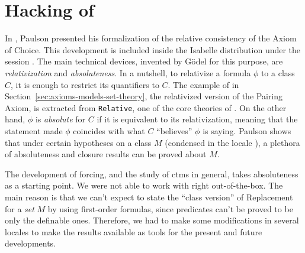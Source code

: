 \section{Hacking of }
\label{sec:hack-constructible}
In \cite{paulson_2003}, Paulson presented his formalization of the
relative consistency of the Axiom of Choice. This development is
included inside the Isabelle distribution under the session 
. The main technical devices, invented by
G\"odel for this purpose, are \emph{relativization} and
\emph{absoluteness}. In a nutshell, to relativize a formula $\phi$ to
a class $C$, it is enough to restrict its quantifiers to $C$. The
example of  in
Section~\ref{sec:axioms-models-set-theory}, the relativized version of
the Pairing Axiom, is extracted from \texttt{Relative}, one of the
core theories of . On the other hand, $\phi$
is \emph{absolute} for $C$ if it is equivalent to its relativization,
meaning that the statement made $\phi$ coincides with what $C$
``believes'' $\phi$ is saying. Paulson shows that under certain
hypotheses  on a class $M$ (condensed in the locale ), a plethora of
absoluteness and closure results can be proved about $M$.

The development of forcing, and the study of ctms in general, takes
absoluteness as a starting point. We were not able to work with
 right out-of-the-box. The main reason is that
we can't expect to state the ``class version'' of Replacement for a
\emph{set} $M$ by
using first-order formulas, since predicates
 can't
be proved to be only the definable ones. Therefore, we had to make
some modifications in several
locales to make the results available as tools for the present and
future developments.



